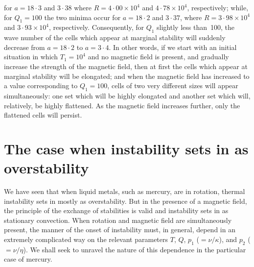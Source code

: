 
for $a = 18{\cdot}3$ and $3{\cdot}38$ where
$R = 4{\cdot}00\times10^{4}$ and $4{\cdot}78\times10^{4}$, respectively;
while, for $Q_1 = 100$ the two minima occur for $a = 18{\cdot}2$ and
$3{\cdot}37$, where $R = 3{\cdot}98\times10^{4}$ and
$3{\cdot}93\times10^{4}$, respectively.  Consequently, for $Q_1$ slightly
less than~100, the wave number of the cells which appear at marginal
stability will suddenly decrease from $a = 18{\cdot}2$ to $a = 3{\cdot}4$.
In other words, if we start with an initial situation in which
$T_1 = 10^{4}$ and no magnetic field is present, and gradually increase the
strength of the magnetic field, then at first the cells which appear at
marginal stability will be elongated; and when the magnetic field has
increased to a value corresponding to $Q_1 = 100$, cells of two very
different sizes will appear simultaneously: one set which will be highly
elongated and another set which will, relatively, be highly flattened.  As the
magnetic field increases further, only the flattened cells will persist.
%

\section{The case when instability sets in as overstability}\label{sec:53}

We have seen that when liquid metals, such as mercury, are in rotation,
thermal instability sets in mostly as overstability. But in the presence of
a magnetic field, the principle of the exchange of stabilities is valid and
instability sets in as stationary convection. When rotation and magnetic
field are simultaneously present, the manner of the onset of instability
must, in general, depend in an extremely complicated way on the
relevant parameters $T$, $Q$, $p_1$ ($= \nu/\kappa$), and $p_2$ ($= \nu/\eta$). We shall seek
to unravel the nature of this dependence in the particular case of mercury.

